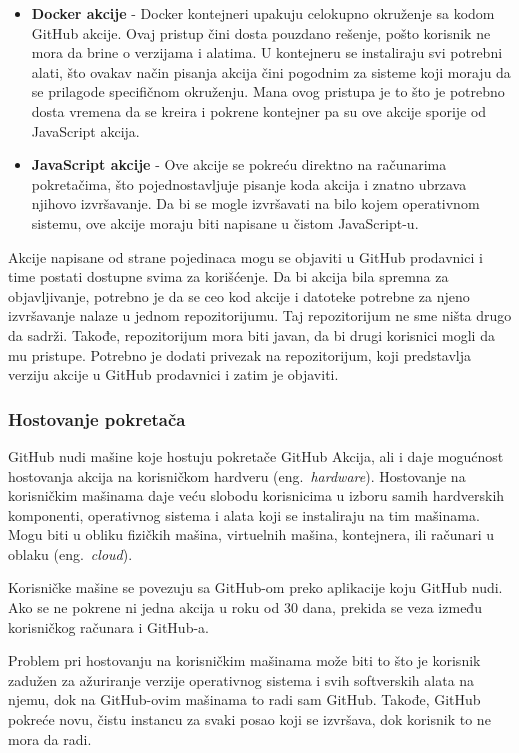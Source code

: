 \documentclass[12pt]{report}
\begin{document}
\begin{itemize}
    \item\textbf{Docker akcije} - Docker kontejneri upakuju celokupno okruženje sa kodom GitHub akcije. Ovaj pristup čini dosta pouzdano rešenje, pošto korisnik ne mora da brine o verzijama i alatima. U kontejneru se instaliraju svi potrebni alati, što ovakav način pisanja akcija čini pogodnim za sisteme koji moraju da se prilagode specifičnom okruženju. Mana ovog pristupa je to što je potrebno dosta vremena da se kreira i pokrene kontejner pa su ove akcije sporije od JavaScript akcija.
    \item\textbf{JavaScript akcije} - Ove akcije se pokreću direktno na računarima pokretačima, što pojednostavljuje pisanje koda akcija i znatno ubrzava njihovo izvršavanje. Da bi se mogle izvršavati na bilo kojem operativnom sistemu, ove akcije moraju biti napisane u čistom JavaScript-u.
\end{itemize}

Akcije napisane od strane pojedinaca mogu se objaviti u GitHub prodavnici i time postati dostupne svima za korišćenje. Da bi akcija bila spremna za objavljivanje, potrebno je da se ceo kod akcije i datoteke potrebne za njeno izvršavanje nalaze u jednom repozitorijumu. Taj repozitorijum ne sme ništa drugo da sadrži. Takođe, repozitorijum mora biti javan, da bi drugi korisnici mogli da mu pristupe. Potrebno je dodati privezak na repozitorijum, koji predstavlja verziju akcije u GitHub prodavnici i zatim je objaviti.

\subsubsection{Hostovanje pokretača}
GitHub nudi mašine koje hostuju pokretače GitHub Akcija, ali i daje mogućnost hostovanja akcija na korisničkom hardveru (eng.\ \textit{hardware}). Hostovanje na korisničkim mašinama daje veću slobodu korisnicima u izboru samih hardverskih komponenti, operativnog sistema i alata koji se instaliraju na tim mašinama. Mogu biti u obliku fizičkih mašina, virtuelnih mašina, kontejnera, ili računari u oblaku (eng.\ \textit{cloud}).

Korisničke mašine se povezuju sa GitHub-om preko aplikacije koju GitHub nudi. Ako se ne pokrene ni jedna akcija u roku od 30 dana, prekida se veza između korisničkog računara i GitHub-a.

Problem pri hostovanju na korisničkim mašinama može biti to što je korisnik zadužen za ažuriranje verzije operativnog sistema i svih softverskih alata na njemu, dok na GitHub-ovim mašinama to radi sam GitHub. Takođe, GitHub pokreće novu, čistu instancu za svaki posao koji se izvršava, dok korisnik to ne mora da radi.
\end{document}
